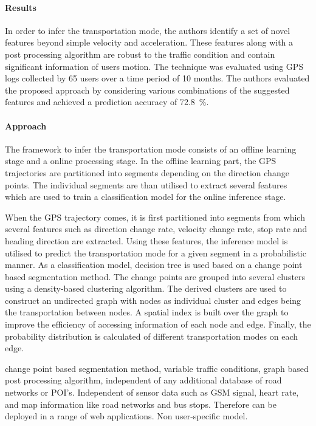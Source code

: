 \paragraph{Results\newline}

In order to infer the transportation mode, the authors identify a set of novel features beyond 
simple velocity and acceleration. These features along with a post processing algorithm are 
robust to the traffic condition and contain significant information of users motion. The technique 
was evaluated using GPS logs collected by 65 users over a time period of 10 months. The authors 
evaluated the proposed approach by considering various combinations of the suggested features
and achieved a prediction accuracy of 72.8~\%.   

\paragraph{Approach\newline}

The framework to infer the transportation mode consists of an offline learning stage and a online
processing stage. In the offline learning part, the GPS trajectories are partitioned into segments
depending on the direction change points. The individual segments are than utilised to extract 
several features which are used to train a classification model for the online inference stage.\newline

When the GPS trajectory comes, it is first partitioned into segments from which several features such as 
direction change rate, velocity change rate, stop rate and heading direction are extracted. 
Using these features, the inference model is utilised to predict the transportation mode for
a given segment in a probabilistic manner. As a classification model, decision tree is used based on 
a change point based segmentation method. The change points are grouped into several clusters using
a density-based clustering algorithm. The derived clusters are used to construct an undirected graph
with nodes as individual cluster and edges being the transportation between nodes. A spatial index is
built over the graph to improve the efficiency of accessing information of each node and edge. Finally,
the probability distribution is calculated of different transportation modes on each edge.    

change point based segmentation method, variable traffic conditions, graph based post processing 
algorithm, independent of any additional database of road networks or POI's. Independent of sensor data
such as GSM signal, heart rate, and map information like road networks and bus stops. Therefore
can be deployed in a range of web applications. Non user-specific model. 


